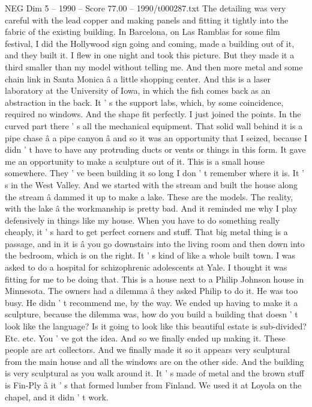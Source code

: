 \begin{textsample}{NEG Dim 5 – 1990 – Score 77.00 – 1990/t000287.txt}
The detailing was very careful with the lead copper and making panels and fitting it tightly into the fabric of the existing building.
In Barcelona, on Las Ramblas for some film festival, I did the Hollywood sign going and coming, made a building out of it, and they built it.
I flew in one night and took this picture.
But they made it a third smaller than my model without telling me.
And then more metal and some chain link in Santa Monica â a little shopping center.
And this is a laser laboratory at the University of Iowa, in which the fish comes back as an abstraction in the back.
It ' s the support labs, which, by some coincidence, required no windows.
And the shape fit perfectly.
I just joined the points.
In the curved part there ' s all the mechanical equipment.
That solid wall behind it is a pipe chase â a pipe canyon â and so it was an opportunity that I seized, because I didn ' t have to have any protruding ducts or vents or things in this form.
It gave me an opportunity to make a sculpture out of it.
This is a small house somewhere.
They ' ve been building it so long I don ' t remember where it is.
It ' s in the West Valley.
And we started with the stream and built the house along the stream â dammed it up to make a lake.
These are the models.
The reality, with the lake â the workmanship is pretty bad.
And it reminded me why I play defensively in things like my house.
When you have to do something really cheaply, it ' s hard to get perfect corners and stuff.
That big metal thing is a passage, and in it is â you go downstairs into the living room and then down into the bedroom, which is on the right.
It ' s kind of like a whole built town.
I was asked to do a hospital for schizophrenic adolescents at Yale.
I thought it was fitting for me to be doing that.
This is a house next to a Philip Johnson house in Minnesota.
The owners had a dilemma â they asked Philip to do it.
He was too busy.
He didn ' t recommend me, by the way.
We ended up having to make it a sculpture, because the dilemma was, how do you build a building that doesn ' t look like the language?
Is it going to look like this beautiful estate is sub-divided?
Etc. etc.
You ' ve got the idea.
And so we finally ended up making it.
These people are art collectors.
And we finally made it so it appears very sculptural from the main house and all the windows are on the other side.
And the building is very sculptural as you walk around it.
It ' s made of metal and the brown stuff is Fin-Ply â it ' s that formed lumber from Finland.
We used it at Loyola on the chapel, and it didn ' t work.

\end{textsample}
